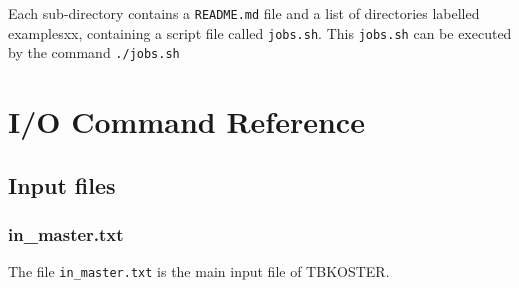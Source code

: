 \documentclass[12pt, onecolumn]{memoir}
\newcommand{\TBK}{\textcolor{nicered}{TBKOSTER}}
\begin{document}
\vspace{0.5cm}

\noindent
Each \textcolor{nicered}{sub-directory} contains a \verb+README.md+ file and a list of directories labelled examplesxx, containing a script file called \verb+jobs.sh+.
This \verb+jobs.sh+ can be executed by the command \verb+./jobs.sh+
\vfil
\pagebreak

\chapter{I/O Command Reference}

\section{Input files}
\label{sec:Input_files}

\subsection{in\_master.txt}
The file \verb+in_master.txt+ is the main input file of \TBK.
\vfil
\end{document}
